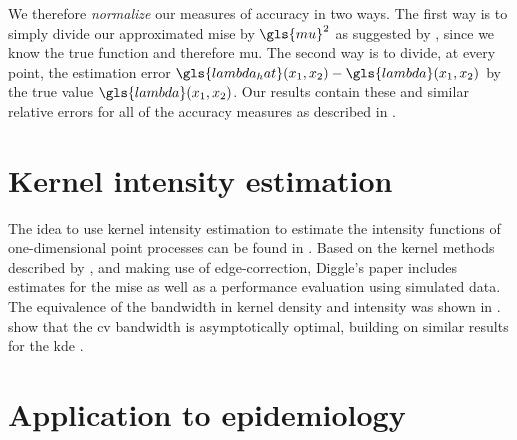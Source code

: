 We therefore \textit{normalize} our measures of accuracy in two ways.
The first way is to simply divide our approximated \gls{mise} by $\gls{mu}^2$
as suggested by \citet{diggle1988equivalence},
since we know the true function and therefore \gls{mu}.
The second way is to divide, at every point,
the estimation error $\gls{lambda_hat}\xvec - \gls{lambda}\xvec$ by the true value $\gls{lambda}\xvec$.
Our results contain these and similar relative errors for all of the accuracy measures
as described in .

\section{Kernel intensity estimation}

The idea to use \gls{kernel intensity estimation} to estimate the intensity functions of one-dimensional point processes can be found in \citet{diggle1985kernel}.
Based on the kernel methods described by \citet{rosenblatt1956remarks},
and making use of edge-correction,
Diggle's paper includes estimates for the \gls{mise} as well as a performance evaluation using simulated data.
The equivalence of the bandwidth in kernel density and intensity was shown in \citet{diggle1988equivalence}.
 show that the \gls{cv} bandwidth is asymptotically optimal,
building on similar results for the \gls{kde} \citep{hall1983large,burman1985data,stone1984asymptotically}.


\section{Application to epidemiology}

